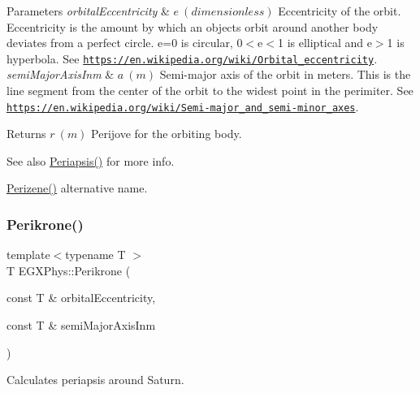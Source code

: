 \begin{DoxyParams}{Parameters}
{\em orbital\+Eccentricity} & $ e\ (dimensionless)$ Eccentricity of the orbit. Eccentricity is the amount by which an objects orbit around another body deviates from a perfect circle. e=0 is circular, 0$<$e$<$1 is elliptical and e$>$1 is hyperbola. See \href{https://en.wikipedia.org/wiki/Orbital_eccentricity}{\tt https\+://en.\+wikipedia.\+org/wiki/\+Orbital\+\_\+eccentricity}. \\
\hline
{\em semi\+Major\+Axis\+Inm} & $ a\ (m)$ Semi-\/major axis of the orbit in meters. This is the line segment from the center of the orbit to the widest point in the perimiter. See \href{https://en.wikipedia.org/wiki/Semi-major_and_semi-minor_axes}{\tt https\+://en.\+wikipedia.\+org/wiki/\+Semi-\/major\+\_\+and\+\_\+semi-\/minor\+\_\+axes}. \\
\hline
\end{DoxyParams}
\begin{DoxyReturn}{Returns}
$ r\ (m)$ Perijove for the orbiting body. 
\end{DoxyReturn}
\begin{DoxySeeAlso}{See also}
\mbox{\hyperlink{group___e_g_x_phys-_periapsis_gad487212733711bc2ce73c8137c9309c3}{Periapsis()}} for more info. 

\mbox{\hyperlink{group___e_g_x_phys-_periapsis_ga8899642f7f872817c611240819b2b968}{Perizene()}} alternative name. 
\end{DoxySeeAlso}
\mbox{\label{group___e_g_x_phys-_periapsis_ga6b7ae332e74a35cd2c116b4a58204f4b}} 
\subsubsection{\texorpdfstring{Perikrone()}{Perikrone()}}
{\footnotesize\ttfamily template$<$typename T $>$ \\
T E\+G\+X\+Phys\+::\+Perikrone (\begin{DoxyParamCaption}\item[{const T \&}]{orbital\+Eccentricity,  }\item[{const T \&}]{semi\+Major\+Axis\+Inm }\end{DoxyParamCaption})}



Calculates periapsis around Saturn. 



